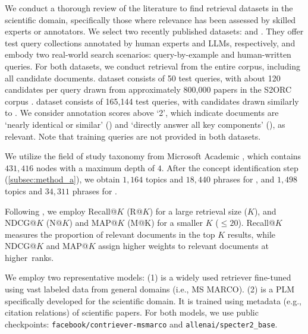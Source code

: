 We conduct a thorough review of the literature to find retrieval datasets in the scientific domain, specifically those where relevance has been assessed by skilled experts or annotators.
We select two recently published datasets: \textbf{\csfcube} \cite{CSFCube} and \textbf{\dorismae} \cite{DORISMAE}.
They offer test query collections annotated by human experts and LLMs, respectively, and embody two real-world search scenarios: query-by-example and human-written queries.
For both datasets, we conduct retrieval from the entire corpus, including all candidate documents.
\csfcube dataset consists of 50 test queries, with about 120 candidates per query drawn from approximately 800,000 papers in the S2ORC corpus \cite{lo2020s2orc}. 
\dorismae dataset consists of 165,144 test queries, with candidates drawn similarly to \csfcube.
We consider annotation scores above `2', which indicate documents are `nearly identical or similar' (\csfcube) and `directly answer all key components' (\dorismae), as relevant.
Note that training queries are not provided in both datasets.


We utilize the field of study taxonomy from Microsoft Academic \cite{MAG_FS}, which contains $431,416$ nodes with a maximum depth of $4$.
After the concept identification step (\cref{subsec:method_a}), we obtain $1,164$ topics and $18,440$ phrases for \csfcube, and $1,498$ topics and $34,311$ phrases for \dorismae.



Following \cite{mackie2023generative, ToTER}, we employ Recall@$K$ (R@$K$) for a large retrieval size ($K$), and NDCG@$K$ (N@$K$) and MAP@$K$ (M@K) for a smaller $K$ ($\leq 20$).
Recall@$K$ measures the proportion of relevant documents in the top $K$ results, while NDCG@$K$ and MAP@$K$ assign higher weights to relevant documents at higher~ranks.


We employ two representative models: 
(1) \textbf{\ctr} \cite{CTR} is a widely used retriever fine-tuned using vast labeled data from general domains (i.e., MS MARCO).
(2) \textbf{\specter} \cite{SPECTER2} is a PLM specifically developed for the scientific domain. It is trained using metadata (e.g., citation relations) of scientific papers. 
For both models, we use public checkpoints: \texttt{facebook/contriever-msmarco} and  \texttt{allenai/specter2\_base}.

